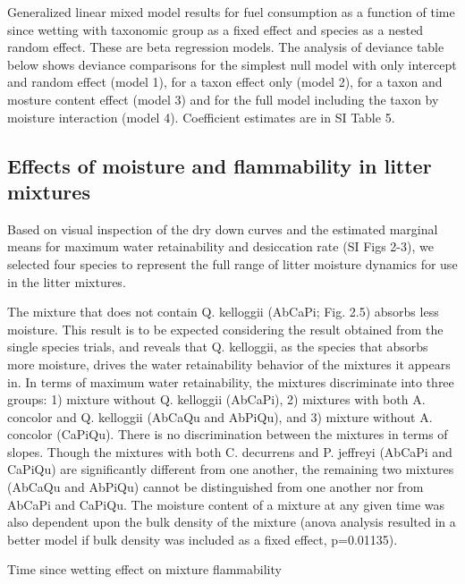 \documentclass[fire,article,submit,moreauthors,pdftex]{Definitions/mdpi}
\begin{document}
\begin{table}[H]
  \caption{Generalized linear mixed model results for fuel consumption as a function of time since wetting with taxonomic group as a fixed effect and species as a nested random effect. These are beta regression models. The analysis of deviance table below shows deviance comparisons for the simplest null model with only intercept and random effect (model 1), for a taxon effect only (model 2), for a taxon and mosture content effect (model 3) and for the full model including the taxon by moisture interaction (model 4). Coefficient estimates are in SI Table 5.}
  \label{tab:consume-time-anova}
\centering

\end{table}


\subsection{Effects of moisture and flammability in litter mixtures}

Based on visual inspection of the dry down curves and the estimated marginal means for maximum water retainability and desiccation rate (SI Figs 2-3), we selected four species to represent the full range of litter moisture dynamics for use in the litter mixtures.

The mixture that does not contain Q. kelloggii (AbCaPi; Fig. 2.5) absorbs less moisture. This result is to be expected considering the result obtained from the single species trials, and reveals that Q. kelloggii, as the species that absorbs more moisture, drives the water retainability behavior of the mixtures it appears in. In terms of maximum water retainability, the mixtures discriminate into three groups: 1) mixture without Q. kelloggii (AbCaPi), 2) mixtures with both A. concolor and Q. kelloggii (AbCaQu and AbPiQu), and 3) mixture without A. concolor (CaPiQu). There is no discrimination between the mixtures in terms of slopes. Though the mixtures with both C. decurrens and P. jeffreyi (AbCaPi and CaPiQu) are significantly different from one another, the remaining two mixtures (AbCaQu and AbPiQu) cannot be distinguished from one another nor from AbCaPi and CaPiQu. The moisture content of a mixture at any given time was also dependent upon the bulk density of the mixture (anova analysis resulted in a better model if bulk density was included as a fixed effect, p=0.01135).


Time since wetting effect on mixture flammability
\end{document}
